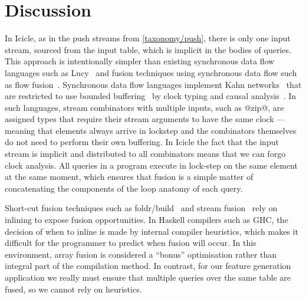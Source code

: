 \section{Discussion}
\label{icicle:s:Conclusion}


In Icicle, as in the push streams from \cref{taxonomy/push}, there is only one input stream, sourced from the input table, which is implicit in the bodies of queries.
This approach is intentionally simpler than existing synchronous data flow languages such as Lucy~\cite{mandel2010lucy} and fusion techniques using synchronous data flow such as flow fusion~\cite{lippmeier2013data}.
Synchronous data flow languages implement Kahn networks~\cite{vrba2009kahn} that are restricted to use bounded buffering~\cite{johnston2004advances} by clock typing and causal analysis~\cite{stephens1997survey}.
In such languages, stream combinators with multiple inputs, such as @zip@, are assigned types that require their stream arguments to have the same clock --- meaning that elements always arrive in lockstep and the combinators themselves do not need to perform their own buffering.
In Icicle the fact that the input stream is implicit and distributed to all combinators means that we can forgo clock analysis.
All queries in a program execute in lock-step on the same element at the same moment, which ensures that fusion is a simple matter of concatenating the components of the loop anatomy of each query.

Short-cut fusion techniques such as foldr/build~\cite{gill1993short} and stream fusion~\cite{coutts2007stream} rely on inlining to expose fusion opportunities.
In Haskell compilers such as GHC, the decision of when to inline is made by internal compiler heuristics, which makes it difficult for the programmer to predict when fusion will occur.
In this environment, array fusion is considered a ``bonus'' optimisation rather than integral part of the compilation method.
In contrast, for our feature generation application we really must ensure that multiple queries over the same table are fused, so we cannot rely on heuristics.

